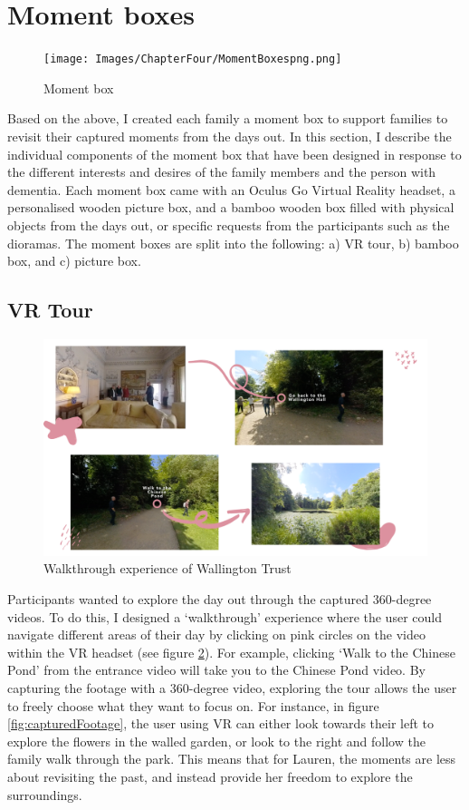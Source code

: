 \section{Moment boxes}
\label{MomentBoxes}

\begin{figure}[htp]
\centering
\texttt{[image: Images/ChapterFour/MomentBoxespng.png]}
\caption{Moment box}
\label{fig:MomentBoxes}
\end{figure}

Based on the above, I created each family a moment box to support families to revisit their captured moments from the days out. In this section, I describe the individual components of the moment box that have been designed in response to the different interests and desires of the family members and the person with dementia. Each moment box came with an Oculus Go Virtual Reality headset, a personalised wooden picture box, and a bamboo wooden box filled with physical objects from the days out, or specific requests from the participants such as the dioramas. The moment boxes are split into the following: a) VR tour, b) bamboo box, and c) picture box.

\subsection{VR Tour}
\label{VRTour}

\begin{figure}[htp]
\centering
\includegraphics[width=.8\linewidth]{Images/ChapterFour/WalktrhoughOfWallington.png}
\caption{Walkthrough experience of Wallington Trust}
\label{fig:wallingtonTrust}
\end{figure}

Participants wanted to explore the day out through the captured 360-degree videos. To do this, I designed a ‘walkthrough’ experience where the user could navigate different areas of their day by clicking on pink circles on the video within the VR headset (see figure \ref{fig:wallingtonTrust}). For example, clicking ‘Walk to the Chinese Pond’ from the entrance video will take you to the Chinese Pond video. By capturing the footage with a 360-degree video, exploring the tour allows the user to freely choose what they want to focus on. For instance, in figure \ref{fig:capturedFootage}, the user using VR can either look towards their left to explore the flowers in the walled garden, or look to the right and follow the family walk through the park. This means that for Lauren, the moments are less about revisiting the past, and instead provide her freedom to explore the surroundings. 

